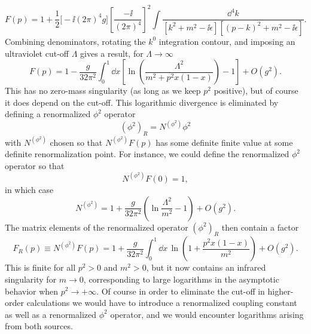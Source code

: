 \begin{equation}
 F(p)=1+\frac{1}{2}\bigl[-\ii(2\pi)^4g\bigr]
 \left[\frac{-\ii}{(2\pi)^4}\right]^2
 \int\frac{\dd^4k}{[k^2+m^2-\ii\epsilon][(p-k)^2+m^2-\ii\epsilon]} .
 \tag{18.1.8}
 \label{eq:18.1.8}
\end{equation}
Combining denominators, rotating the $k^0$ integration contour, and imposing
an ultraviolet cut-off $\Lambda$ gives a result, for $\Lambda\to\infty$
\begin{equation}
 F(p)=1-\frac{g}{32\pi^2}\int_0^1\dd x
 \left[\ln\left(\frac{\Lambda^2}{m^2+p^2x(1-x)}\right)-1\right]
 +O(g^2) .
 \tag{18.1.9}
 \label{eq:18.1.9}
\end{equation}
This has no zero-mass singularity (as long as we keep $p^2$ positive), but of
course it does depend on the cut-off. This logarithmic divergence is
eliminated by defining a renormalized $\phi^2$ operator
\begin{equation}
 (\phi^2)_R=N^{(\phi^2)}\phi^2
 \tag{18.1.10}
 \label{eq:18.1.10}
\end{equation}
with $N^{(\phi^2)}$ chosen so that $N^{(\phi^2)}F(p)$ has some definite finite
value at some definite renormalization point. For instance, we could define
the renormalized $\phi^2$ operator so that
\begin{equation}
 N^{(\phi^2)}F(0)=1 ,
 \tag{18.1.11}
 \label{eq:18.1.11}
\end{equation}
in which case
\begin{equation}
 N^{(\phi^2)}=1+\frac{g}{32\pi^2}
 \left(\ln\frac{\Lambda^2}{m^2}-1\right)+O(g^2) .
 \tag{18.1.12}
 \label{eq:18.1.12}
\end{equation}
The matrix elements of the renormalized operator $(\phi^2)_R$ then contain a
factor
\begin{equation}
 F_R(p)\equiv N^{(\phi^2)}F(p)
 =1+\frac{g}{32\pi^2}\int_0^1\dd x\,
 \ln\left(1+\frac{p^2x(1-x)}{m^2}\right)+O(g^2) .
 \tag{18.1.13}
 \label{eq:18.1.13}
\end{equation}
This is finite for all $p^2>0$ and $m^2>0$, but it now contains an infrared
singularity for $m\to0$, corresponding to large logarithms in the asymptotic
behavior when $p^2\to+\infty$. Of course in order to eliminate the cut-off in
higher-order calculations we would have to introduce a renormalized coupling
constant as well as a renormalized $\phi^2$ operator, and we would encounter
logarithms arising from both sources.

